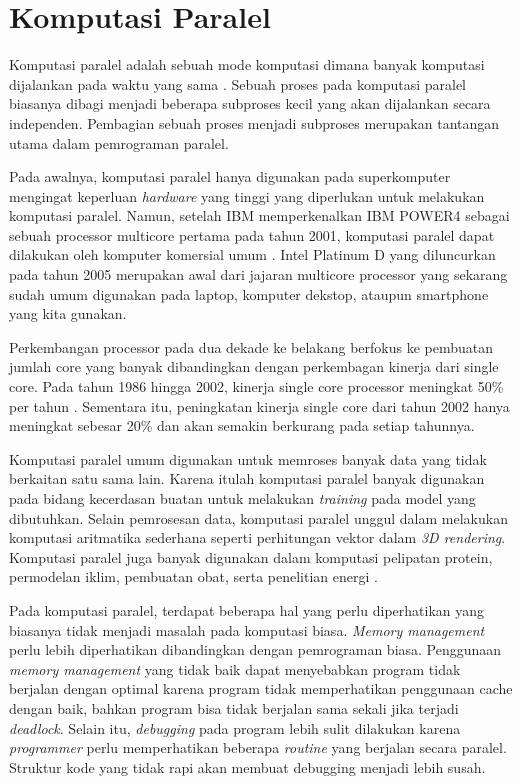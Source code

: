 \section{Komputasi Paralel}
  Komputasi paralel adalah sebuah mode komputasi dimana banyak komputasi dijalankan pada waktu yang sama \citep{highly_parallel_computing}. Sebuah proses pada komputasi paralel biasanya dibagi menjadi beberapa subproses kecil yang akan dijalankan secara independen. Pembagian sebuah proses menjadi subproses merupakan tantangan utama dalam pemrograman paralel.

  Pada awalnya, komputasi paralel hanya digunakan pada superkomputer mengingat keperluan \textit{hardware} yang tinggi yang diperlukan untuk melakukan komputasi paralel. Namun, setelah IBM memperkenalkan IBM POWER4 sebagai sebuah processor multicore pertama pada tahun 2001, komputasi paralel dapat dilakukan oleh komputer komersial umum \citep{power4}. Intel Platinum D yang diluncurkan pada tahun 2005 merupakan awal dari jajaran multicore processor yang sekarang sudah umum digunakan pada laptop, komputer dekstop, ataupun smartphone yang kita gunakan.

  Perkembangan processor pada dua dekade ke belakang berfokus ke pembuatan jumlah core yang banyak dibandingkan dengan perkembagan kinerja dari single core. Pada tahun 1986 hingga 2002, kinerja single core processor meningkat 50\% per tahun \citep{comp_arch_patterson}. Sementara itu, peningkatan kinerja single core dari tahun 2002 hanya meningkat sebesar 20\% \citep{intro_parallel} dan akan semakin berkurang pada setiap tahunnya.

  Komputasi paralel umum digunakan untuk memroses banyak data yang tidak berkaitan satu sama lain. Karena itulah komputasi paralel banyak digunakan pada bidang kecerdasan buatan untuk melakukan \textit{training} pada model yang dibutuhkan. Selain pemrosesan data, komputasi paralel unggul dalam melakukan komputasi aritmatika sederhana seperti perhitungan vektor dalam \textit{3D rendering}. Komputasi paralel juga banyak digunakan dalam komputasi pelipatan protein, permodelan iklim, pembuatan obat, serta penelitian energi \citep{intro_parallel}.

  Pada komputasi paralel, terdapat beberapa hal yang perlu diperhatikan yang biasanya tidak menjadi masalah pada komputasi biasa. \textit{Memory management} perlu lebih diperhatikan dibandingkan dengan pemrograman biasa. Penggunaan \textit{memory management} yang tidak baik dapat menyebabkan program tidak berjalan dengan optimal karena program tidak memperhatikan penggunaan cache dengan baik, bahkan program bisa tidak berjalan sama sekali jika terjadi \textit{deadlock}. Selain itu, \textit{debugging} pada program lebih sulit dilakukan karena \textit{programmer} perlu memperhatikan beberapa \textit{routine} yang berjalan secara paralel. Struktur kode yang tidak rapi akan membuat debugging menjadi lebih susah.

